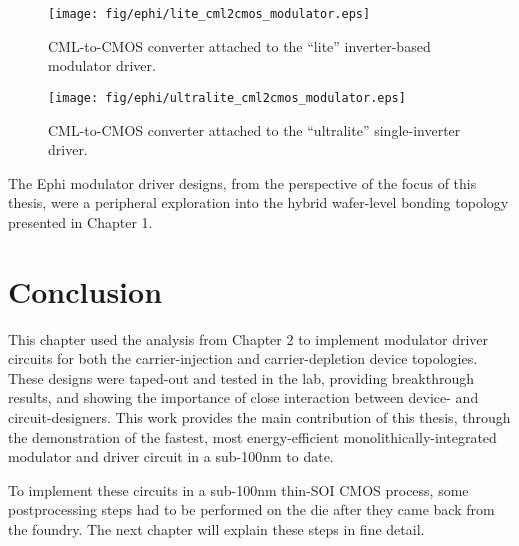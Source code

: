  
	\begin{figure}[ht]
		\begin{center}
			\texttt{[image: fig/ephi/lite\_cml2cmos\_modulator.eps]}
			\caption{\label{fig:ephi_lite_cml2cmos_modulator}CML-to-CMOS converter attached to the “lite” inverter-based modulator driver.}
		\end{center}
	\end{figure}


 
	\begin{figure}[ht]
		\begin{center}
			\texttt{[image: fig/ephi/ultralite\_cml2cmos\_modulator.eps]}
			\caption{\label{fig:ephi_ultralite_cml2cmos_modulator}CML-to-CMOS converter attached to the “ultralite” single-inverter driver.}
		\end{center}
	\end{figure}

The Ephi modulator driver designs, from the perspective of the focus of this thesis, were a peripheral exploration into the hybrid wafer-level bonding topology presented in Chapter 1.  

\section{Conclusion}


This chapter used the analysis from Chapter 2 to implement modulator driver circuits for both the carrier-injection and carrier-depletion device topologies.  These designs were taped-out and tested in the lab, providing breakthrough results, and showing the importance of close interaction between device- and circuit-designers.  This work provides the main contribution of this thesis, through the demonstration of the fastest, most energy-efficient monolithically-integrated modulator and driver circuit in a sub-100nm to date.  

To implement these circuits in a sub-100nm thin-SOI CMOS process, some postprocessing steps had to be performed on the die after they came back from the foundry.  The next chapter will explain these steps in fine detail. 

